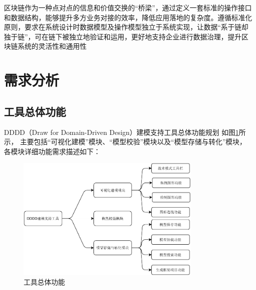 区块链作为一种点对点的信息和价值交换的“桥梁”，通过定义一套标准的操作接口和数据结构，能够提升多方业务对接的效率，降低应用落地的复杂度。遵循标准化原则，要求在系统设计时数据模型及操作模型独立于系统实现，让数据“系于链却独于链”，可在链下被独立地验证和运用，更好地支持企业进行数据治理，提升区块链系统的灵活性和通用性




\section{需求分析}

\subsection{工具总体功能}

DDDD（Draw for Domain-Driven Design）建模支持工具总体功能规划
如图\ref{toolstotal}所示，
主要包括“可视化建模”模块、“模型校验”模块以及“模型存储与转化”模块，
各模块详细功能需求描述如下：

\begin{figure}[!htbp] %
    \centering %
    \includegraphics[width=0.8\textwidth]{FIGs/chapter4/toolstotal.pdf} %
    \caption{工具总体功能} %
    \label{toolstotal} %
\end{figure}%



